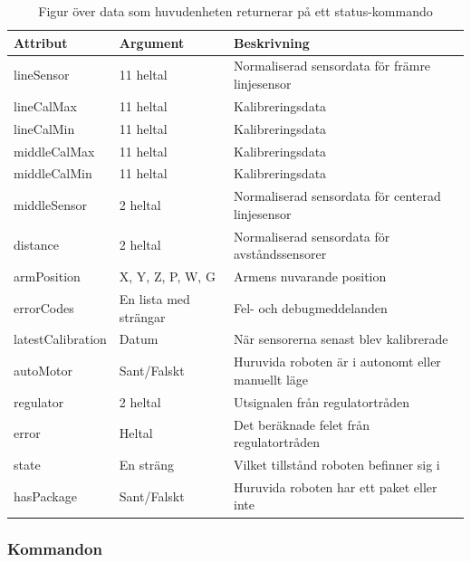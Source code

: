 \begin{table}[h!]
	\centering
	\begin{tabularx}{\textwidth}{| l | X | X |}
		\hline
		\textbf{Attribut} & \textbf{Argument} & {\textbf{Beskrivning}}\\\hline
		{lineSensor} & {11 heltal} & {Normaliserad sensordata för främre linjesensor} \\\hline
		{lineCalMax} & {11 heltal} & {Kalibreringsdata} \\\hline
		{lineCalMin} & {11 heltal} & {Kalibreringsdata} \\\hline
		{middleCalMax} & {11 heltal} & {Kalibreringsdata} \\\hline
		{middleCalMin} & {11 heltal} & {Kalibreringsdata} \\\hline
		{middleSensor} & {2 heltal} & {Normaliserad sensordata för centerad linjesensor} \\\hline
		{distance} & {2 heltal} & {Normaliserad sensordata för avståndssensorer} \\\hline
		{armPosition} & {X, Y, Z, P, W, G} & {Armens nuvarande position} \\\hline
		{errorCodes} & {En lista med strängar} & {Fel- och debugmeddelanden} \\\hline
		{latestCalibration} & {Datum} & {När sensorerna senast blev kalibrerade} \\\hline
		{autoMotor} & {Sant/Falskt} & {Huruvida roboten är i autonomt eller manuellt läge} \\\hline
		{regulator} & {2 heltal} & {Utsignalen från regulatortråden} \\\hline
		{error} & {Heltal} & {Det beräknade felet från regulatortråden} \\\hline
		{state} & {En sträng} & {Vilket tillstånd roboten befinner sig i} \\\hline
		{hasPackage} & {Sant/Falskt} & {Huruvida roboten har ett paket eller inte} \\\hline
	\end{tabularx}
	\caption{Figur över data som huvudenheten returnerar på ett status-kommando} \label{kommunikation-pc-huvud-status}
\end{table}

\subsubsection{Kommandon}

